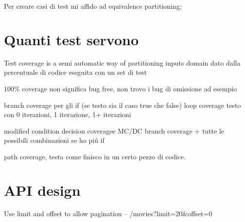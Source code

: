 Per creare casi di test mi affido ad equivalence partitioning;

\section{Quanti test servono}
Test coverage is a semi automatic way of partitioning inputs domain
dato dalla percentuale di codice eseguita con un set di test 

$100\%$ coverage non significa bug free, non trovo i bug di omissione ad esempio

branch coverage per gli if (se testo sia il caso true che false)
loop coverage testo con 0 iterazioni, 1 iterazione, 1+ iterazioni 

modified condition decision coveragee MC/DC 
    branch coverage + tutte le possibili combinazioni se ho pi\'u if

path coverage, testa come finisco in un certo pezzo di codice.

\section{API design}
Use limit and offset to allow pagination	
–  /movies?limit=20&offset=0	
  